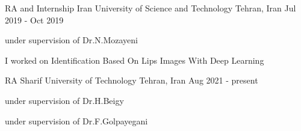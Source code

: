 \begin{cventries}
    \cventry
    {RA and Internship} %
    {Iran University of Science and Technology} %
    {Tehran, Iran} %
    {Jul 2019 - Oct 2019} %
    {
      \begin{cvitems} %
        \item under supervision of Dr.N.Mozayeni
        \item I worked on Identification Based On Lips Images With Deep Learning
      \end{cvitems}
    }
    
    \cventry
    {RA} %
    {Sharif University of Technology} %
    {Tehran, Iran} %
    {Aug 2021 - present} %
    {
      \begin{cvitems} %
        \item under supervision of Dr.H.Beigy
        \item under supervision of Dr.F.Golpayegani
      \end{cvitems}
    }
    
\end{cventries}
